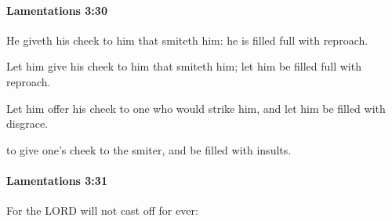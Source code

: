 		\paragraph{Lamentations 3:30} %
			\label{LAMENTATIONS-3-30}

			He giveth his cheek to him that smiteth him: he is filled full with reproach.

			\begin{versebox}
					\item[BHS] 
					\item[LXX] 
					\item[ASV] Let him give his cheek to him that smiteth him; let him be filled full with reproach.
					\item[NIV] Let him offer his cheek to one who would strike him, and let him be filled with disgrace.
					\item[NRSV] to give one’s cheek to the smiter, and be filled with insults.
			\end{versebox}

		\paragraph{Lamentations 3:31} %
			\label{LAMENTATIONS-3-31}

			For the LORD will not cast off for ever:


